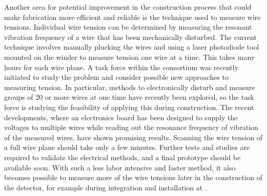 %




Another area for potential improvement in the construction process that could make  fabrication more efficient and reliable is the technique used to measure wire tensions.  Individual wire tension can be determined by measuring the resonant vibration frequency of a wire that has been mechanically disturbed.  The current technique involves manually plucking the wires and using a laser photodiode tool mounted on the winder to measure tension one wire at a time.  This takes many hours for each wire plane. A task force within the consortium was recently initiated to study the problem and consider possible new approaches to measuring tension. In particular, methods to electronically disturb and measure groups of \num{20} or more wires at one time have recently been explored, so the task force is studying the feasibility of applying this during  construction. The recent developments, where an electronics board has been designed to supply the voltages to multiple wires while reading out the resonance frequency of vibration of the measured wires, have shown promising results. Scanning the wire tension of a full wire plane should take only a few minutes. Further tests and studies are required to validate the electrical methods, and a final prototype should be available soon. With such a less labor intensive and faster method, it also becomes possible to measure more of the wire tensions later in the construction of the detector, for example during integration and installation at .  


